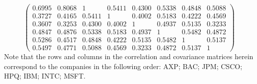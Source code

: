 \begin{examplex}
\[\begin{pmatrix}
0.6995 & 0.8068 & 1      & 0.5411 & 0.4300 & 0.5338 & 0.4848 & 0.5088 \\
0.3727 & 0.4165 & 0.5411 & 1      & 0.4002 & 0.5183 & 0.4222 & 0.4569 \\
0.3607 & 0.3253 & 0.4300 & 0.4002 & 1      & 0.4937 & 0.5135 & 0.3233 \\
0.4847 & 0.4876 & 0.5338 & 0.5183 & 0.4937 & 1      & 0.5482 & 0.4872 \\
0.5286 & 0.4517 & 0.4848 & 0.4222 & 0.5135 & 0.5482 & 1      & 0.5137 \\
0.5497 & 0.4771 & 0.5088 & 0.4569 & 0.3233 & 0.4872 & 0.5137 & 1
\end{pmatrix}
\]
Note that the rows and columns in the correlation and covariance matrices herein
correspond to the companies in the following order: AXP; BAC; JPM; CSCO; HPQ; IBM;
INTC; MSFT.


\end{examplex}
